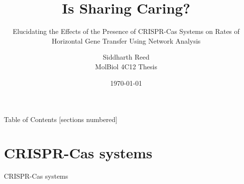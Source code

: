 \documentclass[dvipsnames]{beamer}
\title{{\fontsize{40}{50}\selectfont Is Sharing Caring?}}
\subtitle{Elucidating the Effects of the Presence of CRISPR-Cas Systems on Rates of Horizontal Gene Transfer Using Network Analysis}
\date{\today}
\author{Siddharth Reed\\
        MolBiol 4C12 Thesis
       }
\institute{Golding Lab,\\
           Biology Department,\\
           McMaster University
          }
\begin{document}
\watermarkoff %
\begin{frame}[t,plain]
    \titlepage
\end{frame}
\begin{frame}{Table of Contents}
  [sections numbered]
  \tableofcontents[hideallsubsections]
\end{frame}
\section{CRISPR-Cas systems}
\begin{frame}{}
    \begin{center}
        \Huge \textcolor{OliveGreen}{CRISPR-Cas systems}
    \end{center}
\end{frame}
\end{document}

